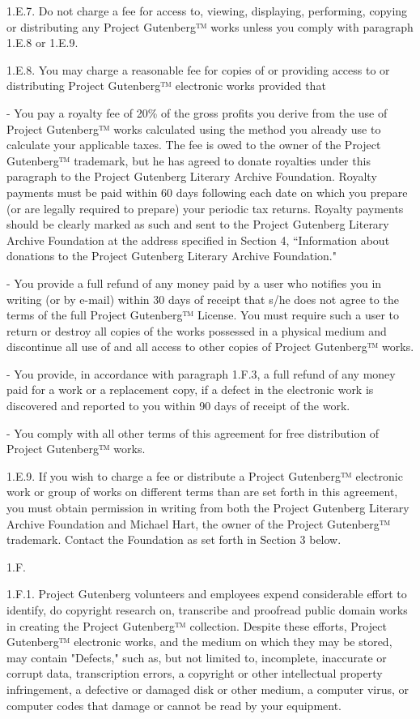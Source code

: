 {1.E.7. Do not charge a fee for access to, viewing, displaying,
performing, copying or distributing any Project Gutenberg™ works
unless you comply with paragraph 1.E.8 or 1.E.9.

1.E.8. You may charge a reasonable fee for copies of or providing
access to or distributing Project Gutenberg™ electronic works provided
that

- You pay a royalty fee of 20\% of the gross profits you derive from
   the use of Project Gutenberg™ works calculated using the method
   you already use to calculate your applicable taxes. The fee is
   owed to the owner of the Project Gutenberg™ trademark, but he
   has agreed to donate royalties under this paragraph to the
   Project Gutenberg Literary Archive Foundation. Royalty payments
   must be paid within 60 days following each date on which you
   prepare (or are legally required to prepare) your periodic tax
   returns. Royalty payments should be clearly marked as such and
   sent to the Project Gutenberg Literary Archive Foundation at the
   address specified in Section 4, “Information about donations to
   the Project Gutenberg Literary Archive Foundation."

- You provide a full refund of any money paid by a user who notifies
   you in writing (or by e-mail) within 30 days of receipt that s/he
   does not agree to the terms of the full Project Gutenberg™
   License. You must require such a user to return or
   destroy all copies of the works possessed in a physical medium
   and discontinue all use of and all access to other copies of
   Project Gutenberg™ works.

- You provide, in accordance with paragraph 1.F.3, a full refund of any
   money paid for a work or a replacement copy, if a defect in the
   electronic work is discovered and reported to you within 90 days
   of receipt of the work.

- You comply with all other terms of this agreement for free
   distribution of Project Gutenberg™ works.

1.E.9. If you wish to charge a fee or distribute a Project Gutenberg™
electronic work or group of works on different terms than are set
forth in this agreement, you must obtain permission in writing from
both the Project Gutenberg Literary Archive Foundation and Michael
Hart, the owner of the Project Gutenberg™ trademark. Contact the
Foundation as set forth in Section 3 below.

1.F.

1.F.1. Project Gutenberg volunteers and employees expend considerable
effort to identify, do copyright research on, transcribe and proofread
public domain works in creating the Project Gutenberg™
collection. Despite these efforts, Project Gutenberg™ electronic
works, and the medium on which they may be stored, may contain
"Defects," such as, but not limited to, incomplete, inaccurate or
corrupt data, transcription errors, a copyright or other intellectual
property infringement, a defective or damaged disk or other medium, a
computer virus, or computer codes that damage or cannot be read by
your equipment.

}
